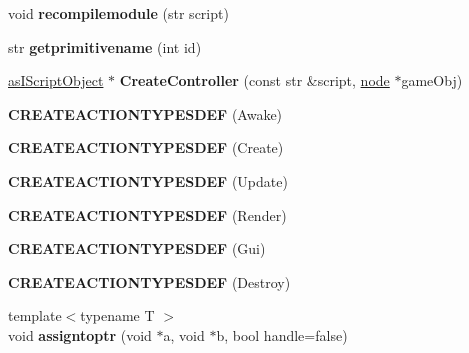 \begin{DoxyCompactItemize}
\item 
\mbox{\label{struct_script_manager_a987d44be4504f5000075b21ea72f2db5}} 
void {\bfseries recompilemodule} (str script)
\item 
\mbox{\label{struct_script_manager_a9493ea7122b6c1b6d94283bb051769b3}} 
str {\bfseries getprimitivename} (int id)
\item 
\mbox{\label{struct_script_manager_af859a1ab9a3bb4cb5d32252db2ded166}} 
\hyperlink{classas_i_script_object}{as\+I\+Script\+Object} $\ast$ {\bfseries Create\+Controller} (const str \&script, \hyperlink{structnode}{node} $\ast$game\+Obj)
\item 
\mbox{\label{struct_script_manager_a445db24d8ea6aa17afea40ff5f4b9ef0}} 
{\bfseries C\+R\+E\+A\+T\+E\+A\+C\+T\+I\+O\+N\+T\+Y\+P\+E\+S\+D\+EF} (Awake)
\item 
\mbox{\label{struct_script_manager_a237428b20523344011181cfc51567bb5}} 
{\bfseries C\+R\+E\+A\+T\+E\+A\+C\+T\+I\+O\+N\+T\+Y\+P\+E\+S\+D\+EF} (Create)
\item 
\mbox{\label{struct_script_manager_a1fcc4201538b1777f77876d5e91a8f70}} 
{\bfseries C\+R\+E\+A\+T\+E\+A\+C\+T\+I\+O\+N\+T\+Y\+P\+E\+S\+D\+EF} (Update)
\item 
\mbox{\label{struct_script_manager_abcabca557bbebfb3efa920b06fc53bc5}} 
{\bfseries C\+R\+E\+A\+T\+E\+A\+C\+T\+I\+O\+N\+T\+Y\+P\+E\+S\+D\+EF} (Render)
\item 
\mbox{\label{struct_script_manager_abc403b50d1e51b513069e7ed956afa03}} 
{\bfseries C\+R\+E\+A\+T\+E\+A\+C\+T\+I\+O\+N\+T\+Y\+P\+E\+S\+D\+EF} (Gui)
\item 
\mbox{\label{struct_script_manager_acf7f08138f7a9ee97d33dcb8418c7b03}} 
{\bfseries C\+R\+E\+A\+T\+E\+A\+C\+T\+I\+O\+N\+T\+Y\+P\+E\+S\+D\+EF} (Destroy)
\item 
\mbox{\label{struct_script_manager_ab272b98e30c284d00618b3a7f1e2119c}} 
{\footnotesize template$<$typename T $>$ }\\void {\bfseries assigntoptr} (void $\ast$a, void $\ast$b, bool handle=false)

\end{DoxyCompactItemize}
